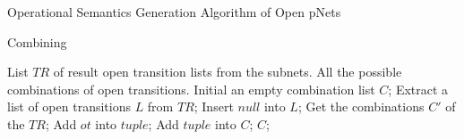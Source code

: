 \documentclass{lncs/llncs}
\begin{document}
\begin{algorithm}
\caption{Operational Semantics Generation Algorithm of Open pNets} 
\begin{algorithmic}[1]

\Require 
\Ensure 

\State \Return

\end{algorithmic} 
\end{algorithm}

\begin{algorithm}
\caption{Combining}
\begin{algorithmic}[1]

\Require List $TR$ of result open transition lists from the subnets. 
\Ensure All the possible combinations of open transitions.
\State Initial an empty combination list $C$;
\State Extract a list of open transitions $L$ from $TR$;
\State Insert $null$ into $L$;
\State Get the combinations $C'$ of the $TR$;
		\State Add $ot$ into $tuple$;
		\State Add $tuple$ into $C$;
	\EndFor
\EndFor 
\State \Return $C$;

\end{algorithmic}  
\end{algorithm}
\end{document}
